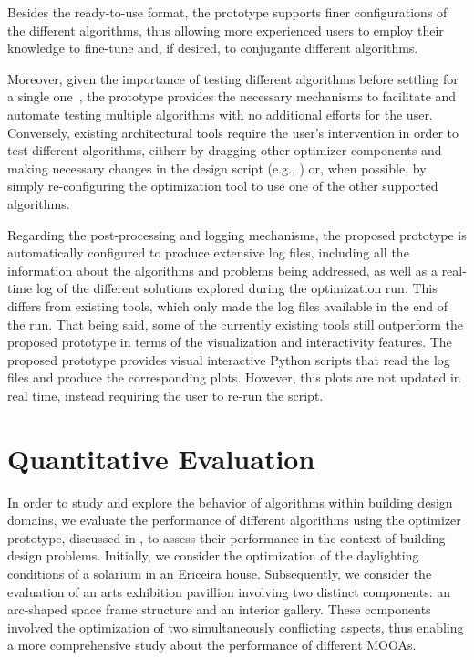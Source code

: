 Besides the ready-to-use format, the prototype supports finer configurations of the different algorithms, thus allowing more experienced users to employ their knowledge to fine-tune and, if desired, to conjugante different algorithms. 

Moreover, given the importance of testing different algorithms before settling for a single one~\cite{Wortmann2016BBO}, the prototype provides the necessary mechanisms to facilitate and automate testing multiple algorithms with no additional efforts for the user. Conversely, existing architectural tools require the user's intervention in order to test different algorithms, eitherr by dragging other optimizer components and making necessary changes in the design script (e.g., ) or, when possible, by simply re-configuring the optimization tool to use one of the other supported algorithms. 

Regarding the post-processing and logging mechanisms, the proposed prototype is automatically configured to produce extensive log files, including all the information about the algorithms and problems being addressed, as well as a real-time log of the different solutions explored during the optimization run. This differs from existing tools, which only made the log files available in the end of the run. That being said, some of the currently existing tools still outperform the proposed prototype in terms of the visualization and interactivity features. The proposed prototype provides visual interactive Python scripts that read the log files and produce the corresponding plots. However, this plots are not updated in real time, instead requiring the user to re-run the script.

\section{Quantitative Evaluation}
\label{sec:quantitative}

In order to study and explore the behavior of algorithms within building design domains, we evaluate the performance of different algorithms using the optimizer prototype,  discussed in , to assess their performance in the context of building design problems. Initially, we consider the optimization of the daylighting conditions of a solarium in an Ericeira house. Subsequently, we consider the evaluation of an arts exhibition pavillion involving two distinct components: an arc-shaped space frame structure and an interior gallery. These components involved the optimization of two simultaneously conflicting aspects, thus enabling a more comprehensive study about the performance of different \acp{MOOA}.

